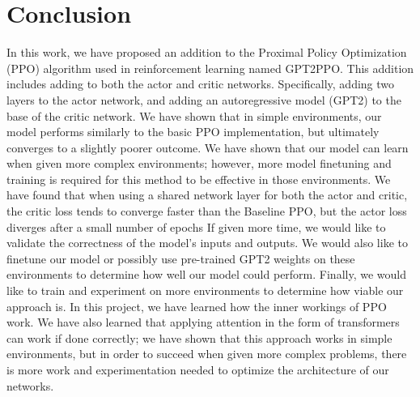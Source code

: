 
\section{Conclusion}
\label{sec:conclusion}

In this work, we have proposed an addition to the Proximal Policy Optimization (PPO) algorithm used in reinforcement learning named GPT2PPO.
This addition includes adding to both the actor and critic networks. Specifically, adding two layers to the actor network, and
adding an autoregressive model (GPT2) to the base of the critic network. We have shown that in simple environments, our model performs similarly to
the basic PPO implementation, but ultimately converges to a slightly poorer outcome. We have shown that our model can learn when given more complex
environments; however, more model finetuning and training is required for this method to be effective in those environments.
We have found that when using a shared network layer for both the actor and critic, the critic loss tends to converge faster than the Baseline PPO, but the actor loss
diverges after a small number of epochs
If given more time,
we would like to validate the correctness of the model's inputs and outputs. We would also like to finetune our model or possibly use pre-trained
GPT2 weights on these environments to determine how well our model could perform. Finally, we would like to train and experiment on more environments
to determine how viable our approach is.
In this project, we have learned how the inner workings of PPO work. We have also learned that applying attention in the form of transformers can work
if done correctly; we have shown that this approach works in simple environments, but in order to succeed when given more complex problems, there is more
work and experimentation needed to optimize the architecture of our networks.





